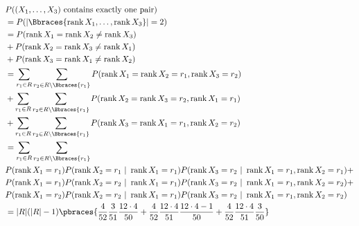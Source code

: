 \begin{solution}
\begin{enumerate}[label = (\alph*)]
    \begin{align*}
        &
        P((X_1, \dots, X_3) ~\text{contains exactly one pair}) \\
        & =
        P(|\Bbraces{\operatorname{rank} X_1, \dots, \operatorname{rank} X_3}| = 2) \\
        & =
        P(\operatorname{rank} X_1 = \operatorname{rank} X_2 \neq \operatorname{rank} X_3) \\
        & +
        P(\operatorname{rank} X_2 = \operatorname{rank} X_3 \neq \operatorname{rank} X_1) \\
        & +
        P(\operatorname{rank} X_3 = \operatorname{rank} X_1 \neq \operatorname{rank} X_2) \\
        & =
        \sum_{r_1 \in R} \sum_{r_2 \in R \setminus \Bbraces{r_1}}
            P(\operatorname{rank} X_1 = \operatorname{rank} X_2 = r_1, \operatorname{rank} X_3 = r_2) \\
        & +
        \sum_{r_1 \in R} \sum_{r_2 \in R \setminus \Bbraces{r_1}}
            P(\operatorname{rank} X_2 = \operatorname{rank} X_3 = r_2, \operatorname{rank} X_1 = r_1) \\
        & +
        \sum_{r_1 \in R} \sum_{r_2 \in R \setminus \Bbraces{r_1}}
            P(\operatorname{rank} X_3 = \operatorname{rank} X_1 = r_1, \operatorname{rank} X_2 = r_2) \\
        & =
        \sum_{r_1 \in R} \sum_{r_2 \in R \setminus \Bbraces{r_1}} \\
            & P(\operatorname{rank} X_1 = r_1) P(\operatorname{rank} X_2 = r_1 ~|~ \operatorname{rank} X_1 = r_1) P(\operatorname{rank} X_3 = r_2 ~|~ \operatorname{rank} X_1 = r_1, \operatorname{rank} X_2 = r_1)
            + \\
            & P(\operatorname{rank} X_1 = r_1) P(\operatorname{rank} X_2 = r_2 ~|~ \operatorname{rank} X_1 = r_1) P(\operatorname{rank} X_3 = r_2 ~|~ \operatorname{rank} X_1 = r_1, \operatorname{rank} X_2 = r_2)
            + \\
            & P(\operatorname{rank} X_1 = r_2) P(\operatorname{rank} X_2 = r_2 ~|~ \operatorname{rank} X_1 = r_1) P(\operatorname{rank} X_3 = r_2 ~|~ \operatorname{rank} X_1 = r_1, \operatorname{rank} X_2 = r_2) \\
        & =
        |R| (|R| - 1)
        \pbraces
        {
            \frac{4}{52} \frac{3}{51} \frac{12 \cdot 4}{50}
            +
            \frac{4}{52} \frac{12 \cdot 4}{51} \frac{12 \cdot 4 - 1}{50}
            +
            \frac{4}{52} \frac{12 \cdot 4}{51} \frac{3}{50}
        }
    \end{align*}

\end{enumerate}

\end{solution}

